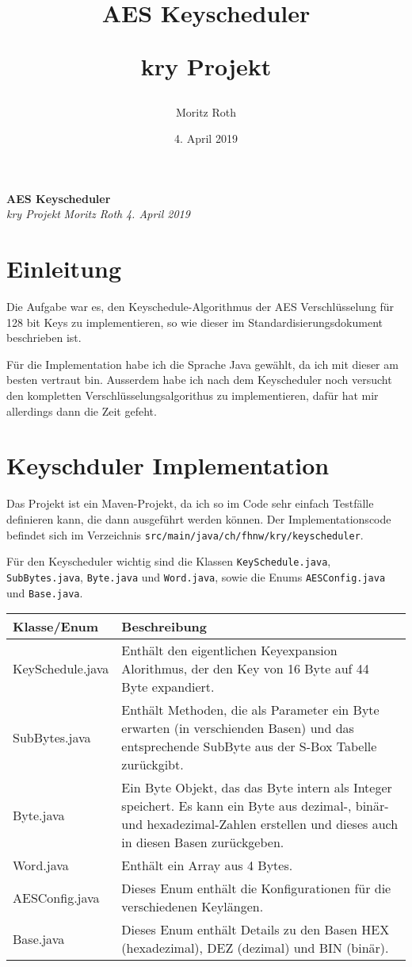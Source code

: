 \documentclass[12pt, letterpaper]{article}
\title{AES Keyscheduler \\
\begin{large}
kry Projekt
\end{large} }
\author{Moritz Roth}
\date{4. April 2019}
\newcommand{\code}[1]{\texttt{#1}}
\begin{document}
\begin{titlepage}
  \centering
  \vfill
  \LARGE\textbf{AES Keyscheduler}\\
  \Large\textit{kry Projekt}
  \vfill
  \large\textit{Moritz Roth}
  \vfill
  \large\textit{4. April 2019}
  \vfill
\end{titlepage}

\section*{Einleitung}
Die Aufgabe war es, den Keyschedule-Algorithmus der AES Verschlüsselung für 128 bit Keys zu implementieren, so wie dieser im Standardisierungsdokument beschrieben ist.

Für die Implementation habe ich die Sprache Java gewählt, da ich mit dieser am besten vertraut bin. Ausserdem habe ich nach dem Keyscheduler noch versucht den kompletten Verschlüsselungsalgorithus zu implementieren, dafür hat mir allerdings dann die Zeit gefeht.

\section*{Keyschduler Implementation}

Das Projekt ist ein Maven-Projekt, da ich so im Code sehr einfach Testfälle definieren kann, die dann ausgeführt werden können. Der Implementationscode befindet sich im Verzeichnis \code{src/main/java/ch/fhnw/kry/keyscheduler}.


Für den Keyscheduler wichtig sind die Klassen \code{KeySchedule.java}, \code{SubBytes.java}, \code{Byte.java} und \code{Word.java}, sowie die Enums \code{AESConfig.java} und \code{Base.java}.

\begin{center}
  {\tablinesep=10pt\begin{tabular}{l|p{10cm}}
  Klasse/Enum & Beschreibung \\ \hline
  KeySchedule.java & Enthält den eigentlichen Keyexpansion Alorithmus, der den Key von 16 Byte auf 44 Byte expandiert. \\
  SubBytes.java & Enthält Methoden, die als Parameter ein Byte erwarten (in verschienden Basen) und das entsprechende SubByte aus der S-Box Tabelle zurückgibt. \\
  Byte.java & Ein Byte Objekt, das das Byte intern als Integer speichert. Es kann ein Byte aus dezimal-, binär- und hexadezimal-Zahlen erstellen und dieses auch in diesen Basen zurückgeben. \\
  Word.java & Enthält ein Array aus 4 Bytes. \\
  AESConfig.java & Dieses Enum enthält die Konfigurationen für die verschiedenen Keylängen. \\
  Base.java & Dieses Enum enthält Details zu den Basen HEX (hexadezimal), DEZ (dezimal) und BIN (binär).
  \end{tabular}}
\end{center}
\end{document}

